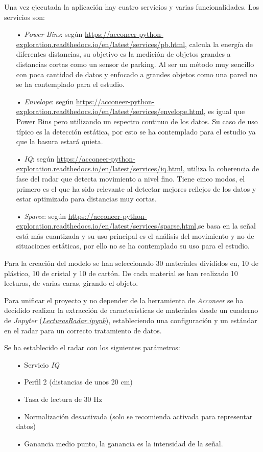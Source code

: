 Una vez ejecutada la aplicación hay cuatro servicios y varias funcionalidades. Los servicios son:
\begin{itemize}
\item[•] \textit{Power Bins}: según \url{https://acconeer-python-exploration.readthedocs.io/en/latest/services/pb.html}, calcula la energía de diferentes distancias, su objetivo es la medición de objetos grandes a distancias cortas como un sensor de parking. Al ser un método muy sencillo con poca cantidad de datos y enfocado a grandes objetos como una pared no se ha contemplado para el estudio.
\item[•] \textit{Envelope}: según \url{https://acconeer-python-exploration.readthedocs.io/en/latest/services/envelope.html}, es igual que Power Bins pero utilizando un espectro continuo de los datos. Su caso de uso típico es la detección estática, por esto se ha contemplado para el estudio ya que la basura estará quieta.
\item[•] \textit{IQ}: según \url{https://acconeer-python-exploration.readthedocs.io/en/latest/services/iq.html}, utiliza la coherencia de fase del radar que detecta movimiento a nivel fino. Tiene cinco modos, el primero es el que ha sido relevante al detectar mejores reflejos de los datos y estar optimizado para distancias muy cortas.
\item[•] \textit{Sparce}: según \url{https://acconeer-python-exploration.readthedocs.io/en/latest/services/sparse.html},se basa en la señal está más cuantizada y su uso principal es el análisis del movimiento y no de situaciones estáticas, por ello no se ha contemplado su uso para el estudio.
\end{itemize}

Para la creación del modelo se han seleccionado 30 materiales divididos en, 10 de plástico, 10 de cristal y 10 de cartón. De cada material se han realizado 10 lecturas, de varias caras, girando el objeto.

Para unificar el proyecto y no depender de la herramienta de \textit{Acconeer} se ha decidido realizar la extracción de características de materiales desde un cuaderno de \textit{Jupyter} (\textit{\href{https://github.com/mecyc/TFG_RADAR_60GHZ/blob/main/scripts/LecturasRadar.ipynb}{LecturasRadar.ipynb}}), estableciendo una configuración y un estándar en el radar para un correcto tratamiento de datos.

Se ha establecido el radar con los siguientes parámetros:
\begin{itemize}
	\item[•]Servicio \textit{IQ}
	\item[•]Perfil 2 (distancias de unos 20 cm)
	\item[•]Tasa de lectura de 30 Hz
	\item[•]Normalización desactivada (solo se recomienda activada para representar datos)
	\item[•]Ganancia medio punto, la ganancia es la intensidad de la señal.
\end{itemize}


